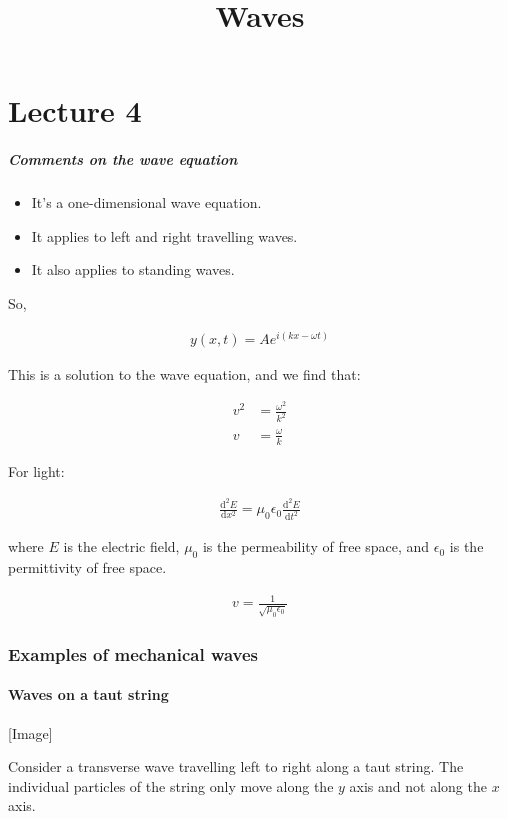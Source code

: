 \documentclass[10pt,a4paper]{article}
\title{Waves}
\newcommand{\rmd}{\mathrm{d}}
\newcommand{\difn}[3]{\frac{\rmd^{#3} #1}{\rmd #2^{#3}}}
\begin{document}
\part*{Lecture 4}

\subsubsection*{Comments on the wave equation}

\begin{itemize}
\item It's a one-dimensional wave equation.
\item It applies to left and right travelling waves.
\item It also applies to standing waves.
\end{itemize}

So,

\begin{align*}
y(x, t) = A e^{i(kx-\omega t)}
\end{align*}

This is a solution to the wave equation, and we find that:

\begin{align*}
v^{2} &= \frac{\omega^{2}}{k^{2}} \\
v &= \frac{\omega}{k}
\end{align*}

For light:

\begin{align*}
\difn{E}{x}{2} = \mu_{0} \epsilon_{0} \difn{E}{t}{2}
\end{align*}

where $E$ is the electric field, $\mu_{0}$ is the permeability of free space, and $\epsilon_{0}$ is the permittivity of free space.

\begin{align*}
v = \frac{1}{\sqrt{\mu_{0}\epsilon_{0}}}
\end{align*}

\section*{Examples of mechanical waves}

\subsection*{Waves on a taut string}

[Image]

Consider a transverse wave travelling left to right along a taut string. The individual particles of the string only move along the $y$ axis and not along the $x$ axis.
\end{document}
